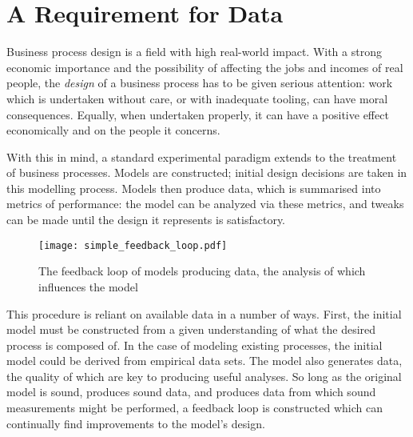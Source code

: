 \documentclass[draft,12pt]{llncs}  %
\begin{document}
\maketitle


\section{A Requirement for Data}
\label{sec:intro}


Business process design is a field with high real-world impact. With a strong
economic importance and the possibility of affecting the jobs and incomes of
real people, the \emph{design} of a business process has to be given serious
attention: work which is undertaken without care, or with inadequate tooling,
can have moral consequences. Equally, when undertaken properly, it can have a
positive effect economically and on the people it concerns.
\par

With this in mind, a standard experimental paradigm extends to the treatment of
business processes. Models are constructed; initial design decisions are
taken in this modelling process. Models then produce data, which is summarised
into metrics of performance: the model can be analyzed via these metrics, and
tweaks can be made until the design it represents is satisfactory.
\par

\begin{figure}[h]
  \centering
  \texttt{[image: simple\_feedback\_loop.pdf]}
  \caption[Feedback loop design]{The feedback loop of models producing data, the
    analysis of which influences the model}
  \label{fig:simple_feedback_loop}
\end{figure}

This procedure is reliant on available data in a number of ways. First, the
initial model must be constructed from a given understanding of what the desired
process is composed of. In the case of modeling existing processes,
the initial model could be derived from empirical data sets. The model also
generates data, the quality of which are key to producing useful analyses. So
long as the original model is sound, produces sound data, and produces data from
which sound measurements might be performed, a feedback loop is constructed
which can continually find improvements to the model's design. \par
\end{document}
